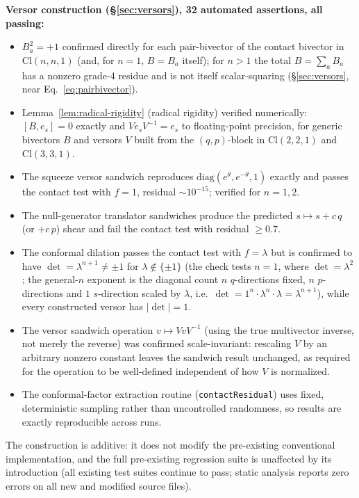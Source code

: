 \documentclass[11pt]{article}
\newcommand{\Cl}{\mathrm{Cl}}
\begin{document}
\textbf{Versor construction (\S\ref{sec:versors}), 32 automated assertions, all passing:}
\begin{itemize}[leftmargin=1.4em]
\item $B_a^2=+1$ confirmed directly for each pair-bivector of the contact bivector in $\Cl(n,n,1)$ (and, for $n=1$, $B=B_a$ itself); for $n>1$ the total $B=\sum_a B_a$ has a nonzero grade-4 residue and is not itself scalar-squaring (\S\ref{sec:versors}, near Eq.~\eqref{eq:pairbivector}).
\item Lemma~\ref{lem:radical-rigidity} (radical rigidity) verified numerically: $[B,e_s]=0$ exactly and $Ve_sV^{-1}=e_s$ to floating-point precision, for generic bivectors $B$ and versors $V$ built from the $(q,p)$-block in $\Cl(2,2,1)$ and $\Cl(3,3,1)$.
\item The squeeze versor sandwich reproduces $\mathrm{diag}(e^\theta,e^{-\theta},1)$ exactly and passes the contact test with $f=1$, residual $\sim10^{-15}$; verified for $n=1,2$.
\item The null-generator translator sandwiches produce the predicted $s\mapsto s+c\,q$ (or $+c\,p$) shear and fail the contact test with residual $\ge0.7$.
\item The conformal dilation passes the contact test with $f=\lambda$ but is confirmed to have $\det=\lambda^{n+1}\ne\pm1$ for $\lambda\notin\{\pm1\}$ (the check tests $n=1$, where $\det=\lambda^2$; the general-$n$ exponent is the diagonal count $n$ $q$-directions fixed, $n$ $p$-directions and $1$ $s$-direction scaled by $\lambda$, i.e.\ $\det=1^n\cdot\lambda^n\cdot\lambda=\lambda^{n+1}$), while every constructed versor has $|\det|=1$.
\item The versor sandwich operation $v\mapsto Vv V^{-1}$ (using the true multivector inverse, not merely the reverse) was confirmed scale-invariant: rescaling $V$ by an arbitrary nonzero constant leaves the sandwich result unchanged, as required for the operation to be well-defined independent of how $V$ is normalized.
\item The conformal-factor extraction routine (\texttt{contactResidual}) uses fixed, deterministic sampling rather than uncontrolled randomness, so results are exactly reproducible across runs.
\end{itemize}

The construction is additive: it does not modify the pre-existing conventional implementation, and the full pre-existing regression suite is unaffected by its introduction (all existing test suites continue to pass; static analysis reports zero errors on all new and modified source files).
\end{document}
